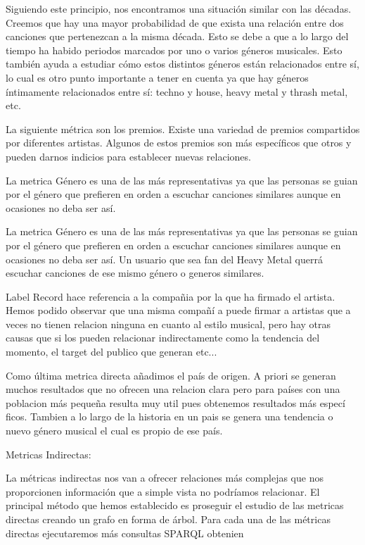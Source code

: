Siguiendo este principio, nos encontramos una situación similar con las décadas. Creemos que hay una mayor probabilidad de que exista una relación entre dos canciones que pertenezcan a la misma década. Esto se debe a que a lo largo del tiempo ha habido periodos marcados por uno o varios géneros musicales. Esto también ayuda a estudiar cómo estos distintos géneros están relacionados entre sí, lo cual es otro punto importante a tener en cuenta ya que hay géneros íntimamente relacionados entre sí: techno y house, heavy metal y thrash metal, etc.

La siguiente métrica son los premios. Existe una variedad de premios compartidos por diferentes artistas. Algunos de estos premios son más específicos que otros y pueden darnos indicios para establecer nuevas relaciones.

La metrica Género es una de las más representativas ya que las personas se guian por el género que prefieren en orden a escuchar canciones similares aunque en ocasiones no deba ser así.


La metrica Género es una de las más representativas ya que las personas se guian por el género que prefieren en orden a escuchar canciones similares aunque en ocasiones no deba ser así. Un usuario que sea fan del Heavy Metal querrá escuchar canciones  de ese mismo género o generos similares.

Label Record hace referencia a la compañia por la que ha firmado el artista. Hemos podido observar que una misma compañí
a puede firmar a artistas que a veces no tienen relacion ninguna en cuanto al estilo musical, pero hay otras causas que si los pueden relacionar indirectamente como la tendencia del momento, el target del publico que generan etc...

Como última metrica directa añadimos el país de origen. A priori se generan muchos resultados que no ofrecen una relacion clara pero para países con una poblacion más pequeña resulta muy util pues obtenemos resultados más especí
ficos. Tambien a lo largo de la historia en un pais se genera una tendencia o nuevo género musical el cual es propio de ese país.

Metricas Indirectas:

La métricas indirectas nos van a ofrecer relaciones más complejas que nos proporcionen información que a simple vista no podríamos relacionar.
El principal método que hemos establecido es proseguir el estudio de las metricas directas creando un grafo en forma de árbol.
Para cada una de las métricas directas ejecutaremos más consultas SPARQL obtenien
